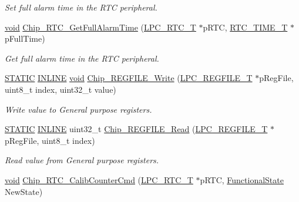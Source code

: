 \begin{DoxyCompactItemize}
\begin{DoxyCompactList}\small\item\em Set full alarm time in the R\-T\-C peripheral. \end{DoxyCompactList}\item 
\hyperlink{Paradigm_2Tern__EE_2small_2portmacro_8h_a14d32f8130d3c0b212cfc751730b5b49}{void} \hyperlink{group__RTC__17XX__40XX_ga21b9a7c640870482b47deda15ff0a01b}{Chip\-\_\-\-R\-T\-C\-\_\-\-Get\-Full\-Alarm\-Time} (\hyperlink{structLPC__RTC__T}{L\-P\-C\-\_\-\-R\-T\-C\-\_\-\-T} $\ast$p\-R\-T\-C, \hyperlink{structRTC__TIME__T}{R\-T\-C\-\_\-\-T\-I\-M\-E\-\_\-\-T} $\ast$p\-Full\-Time)
\begin{DoxyCompactList}\small\item\em Get full alarm time in the R\-T\-C peripheral. \end{DoxyCompactList}\item 
\hyperlink{group__LPC__Types__Public__Macros_ga10b2d890d871e1489bb02b7e70d9bdfb}{S\-T\-A\-T\-I\-C} \hyperlink{group__LPC__Types__Public__Types_ga2eb6f9e0395b47b8d5e3eeae4fe0c116}{I\-N\-L\-I\-N\-E} \hyperlink{Paradigm_2Tern__EE_2small_2portmacro_8h_a14d32f8130d3c0b212cfc751730b5b49}{void} \hyperlink{group__RTC__17XX__40XX_ga8607152173e77715f7cc42be74799b65}{Chip\-\_\-\-R\-E\-G\-F\-I\-L\-E\-\_\-\-Write} (\hyperlink{structLPC__REGFILE__T}{L\-P\-C\-\_\-\-R\-E\-G\-F\-I\-L\-E\-\_\-\-T} $\ast$p\-Reg\-File, uint8\-\_\-t index, uint32\-\_\-t value)
\begin{DoxyCompactList}\small\item\em Write value to General purpose registers. \end{DoxyCompactList}\item 
\hyperlink{group__LPC__Types__Public__Macros_ga10b2d890d871e1489bb02b7e70d9bdfb}{S\-T\-A\-T\-I\-C} \hyperlink{group__LPC__Types__Public__Types_ga2eb6f9e0395b47b8d5e3eeae4fe0c116}{I\-N\-L\-I\-N\-E} uint32\-\_\-t \hyperlink{group__RTC__17XX__40XX_gafdad7b4e551aa7e6d52b49a7a072f4ae}{Chip\-\_\-\-R\-E\-G\-F\-I\-L\-E\-\_\-\-Read} (\hyperlink{structLPC__REGFILE__T}{L\-P\-C\-\_\-\-R\-E\-G\-F\-I\-L\-E\-\_\-\-T} $\ast$p\-Reg\-File, uint8\-\_\-t index)
\begin{DoxyCompactList}\small\item\em Read value from General purpose registers. \end{DoxyCompactList}\item 
\hyperlink{Paradigm_2Tern__EE_2small_2portmacro_8h_a14d32f8130d3c0b212cfc751730b5b49}{void} \hyperlink{group__RTC__17XX__40XX_ga987c9ab06dc2bb157388ddf9159de813}{Chip\-\_\-\-R\-T\-C\-\_\-\-Calib\-Counter\-Cmd} (\hyperlink{structLPC__RTC__T}{L\-P\-C\-\_\-\-R\-T\-C\-\_\-\-T} $\ast$p\-R\-T\-C, \hyperlink{group__LPC__Types__Public__Types_gac9a7e9a35d2513ec15c3b537aaa4fba1}{Functional\-State} New\-State)

\end{DoxyCompactItemize}
